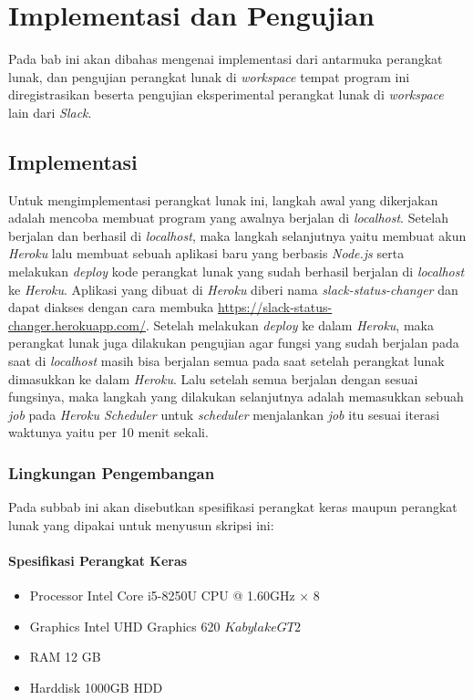 \chapter{Implementasi dan Pengujian}
\label{chap:implementasi dan pengujian}

Pada bab ini akan dibahas mengenai implementasi dari antarmuka perangkat lunak, dan pengujian perangkat lunak di \textit{workspace} tempat program ini diregistrasikan beserta pengujian eksperimental perangkat lunak di \textit{workspace} lain dari \textit{Slack}.

\section{Implementasi}
 Untuk mengimplementasi perangkat lunak ini, langkah awal yang dikerjakan adalah mencoba membuat program yang awalnya berjalan di \textit{localhost}. Setelah berjalan dan berhasil di \textit{localhost}, maka langkah selanjutnya yaitu membuat akun \textit{Heroku} lalu membuat sebuah aplikasi baru yang berbasis \textit{Node.js} serta melakukan \textit{deploy} kode perangkat lunak yang sudah berhasil berjalan di \textit{localhost} ke \textit{Heroku}. Aplikasi yang dibuat di \textit{Heroku} diberi nama \textit{slack-status-changer} dan dapat diakses dengan cara membuka \url{https://slack-status-changer.herokuapp.com/}. Setelah melakukan \textit{deploy} ke dalam \textit{Heroku}, maka perangkat lunak juga dilakukan pengujian agar fungsi yang sudah berjalan pada saat di \textit{localhost} masih bisa berjalan semua pada saat setelah perangkat lunak dimasukkan ke dalam \textit{Heroku}. Lalu setelah semua berjalan dengan sesuai fungsinya, maka langkah yang dilakukan selanjutnya adalah memasukkan sebuah \textit{job} pada \textit{Heroku Scheduler} untuk \textit{scheduler} menjalankan \textit{job} itu sesuai iterasi waktunya yaitu per 10 menit sekali. 
 
\subsection{Lingkungan Pengembangan}
 Pada subbab ini akan disebutkan spesifikasi perangkat keras maupun perangkat lunak yang dipakai untuk menyusun skripsi ini:
\subsubsection{Spesifikasi Perangkat Keras}
\begin{itemize}
    \item Processor Intel Core i5-8250U CPU @ 1.60GHz × 8 
    \item Graphics Intel UHD Graphics 620 \(Kabylake GT2\)
    \item RAM 12 GB
    \item Harddisk 1000GB HDD
\end{itemize}

